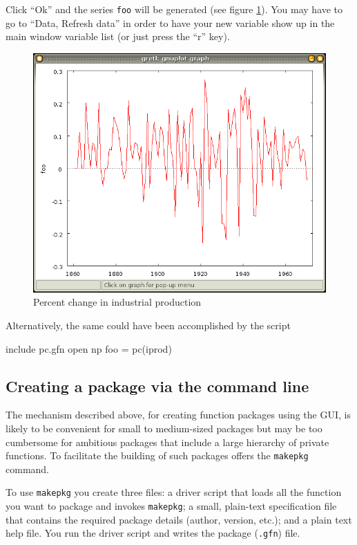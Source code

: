 Click ``Ok'' and the
series \texttt{foo} will be generated (see figure \ref{fig:iprod_pc}).
You may have to go to ``Data, Refresh data'' in order to have your new
variable show up in the main window variable list (or just press the
``r'' key).

\begin{figure}[htbp]
  \centering
  \includegraphics[scale=0.5]{figures/iprod_pc}
  \caption{Percent change in industrial production}
  \label{fig:iprod_pc}
\end{figure}

Alternatively, the same could have been accomplished by the script
\begin{code}
include pc.gfn
open np
foo = pc(iprod)
\end{code}

\subsection{Creating a package via the command line}

The mechanism described above, for creating function packages using
the GUI, is likely to be convenient for small to medium-sized packages
but may be too cumbersome for ambitious packages that include a large
hierarchy of private functions. To facilitate the building of such
packages  offers the \texttt{makepkg} command.

To use \texttt{makepkg} you create three files: a driver script that
loads all the function you want to package and invokes
\texttt{makepkg}; a small, plain-text specification file that contains
the required package details (author, version, etc.); and a plain text
help file.  You run the driver script and  writes the
package (\texttt{.gfn}) file.

